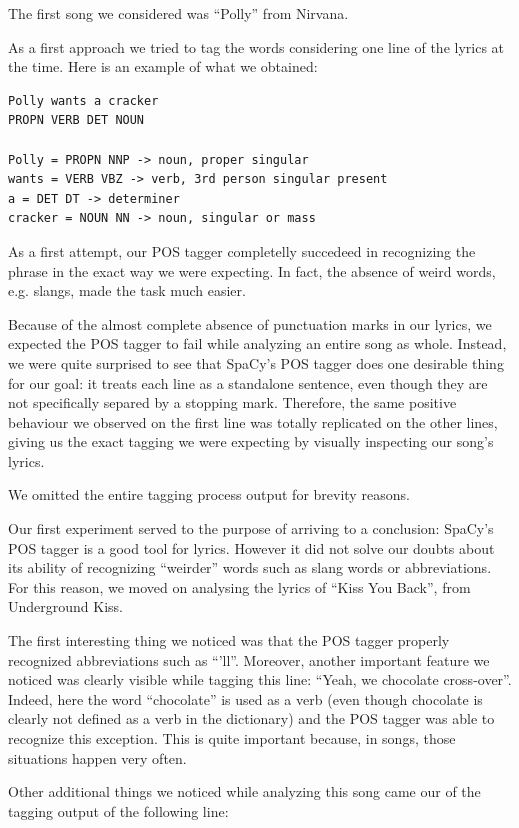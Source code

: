 The first song we considered was ``Polly'' from Nirvana.

As a first approach we tried to tag the words considering one line of the lyrics at the time. Here is an example of
what we obtained:

\begin{lstlisting}
Polly wants a cracker
PROPN VERB DET NOUN 

Polly = PROPN NNP -> noun, proper singular
wants = VERB VBZ -> verb, 3rd person singular present
a = DET DT -> determiner
cracker = NOUN NN -> noun, singular or mass
\end{lstlisting}

As a first attempt, our POS tagger completelly succedeed in recognizing the phrase in the 
exact way we were expecting. In fact, the absence of weird words, e.g. slangs, made the
task much easier.

Because of the almost complete absence of punctuation marks in our lyrics, we expected
the POS tagger to fail while analyzing an entire song as whole. Instead, we were quite
surprised to see that SpaCy's POS tagger does one desirable thing for our goal:
it treats each line as a standalone sentence, even though they are not specifically separed by
a stopping mark. Therefore, the same positive behaviour we observed on the first line
was totally replicated on the other lines, giving us the exact tagging we were
expecting by visually inspecting our song's lyrics.

We omitted the entire tagging process output for brevity reasons.

Our first experiment served to the purpose of arriving to a conclusion: SpaCy's POS tagger
is a good tool for lyrics. However it did not solve our doubts about its ability of recognizing
``weirder'' words such as slang words or abbreviations. For this reason, we moved on 
analysing the lyrics of ``Kiss You Back'', from Underground Kiss.

The first interesting thing we noticed was that the POS tagger properly recognized abbreviations such as ``'ll''.
Moreover, another important feature we noticed was clearly visible while tagging this line: ``Yeah, we chocolate cross-over''.
Indeed, here the word ``chocolate'' is used as a verb (even though chocolate is clearly not defined as a verb in 
the dictionary) and the POS tagger was able to recognize this exception. 
This is quite important because, in songs, those situations happen very often.

Other additional things we noticed while analyzing this song came our of the tagging output of the following line:

